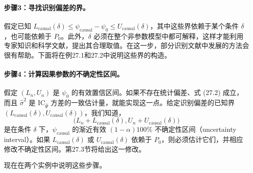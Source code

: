 \paragraph*{步骤3：寻找识别偏差的界。}
假定已知 $L_{\mathrm{causal}}(\delta)\leq\psi_{\mathrm{causal}}-\psi_0\leq U_{\mathrm{causal}}(\delta)$，其中这些界依赖于某个条件 $\delta$，也可能依赖于 $P_0$。此外，$\delta$ 必须在整个非参数模型中都可解释，这样才能利用专家知识和科学文献，提出其合理取值。在这一步，部分识别文献中发展的方法会很有帮助。下面将在例27.1和27.2中说明这些界的构造。

\paragraph*{步骤4：计算因果参数的不确定性区间。}
假定 $(L_n,U_n)$ 是 $\psi_0$ 的有效置信区间。如果不存在统计偏差、式 (27.2) 成立，而且 $\hat\sigma^2$ 是 $\mathrm{IC}_{\hat\Psi}$ 方差的一致估计量，就能实现这一点。给定识别偏差的已知界 $(L_{\mathrm{causal}}(\delta),U_{\mathrm{causal}}(\delta))$，我们知道，
\begin{equation}
 \bigl(L_n+L_{\mathrm{causal}}(\delta),U_n+U_{\mathrm{causal}}(\delta)\bigr)
 \tag{27.4}
\end{equation}
是在条件 $\delta$ 下，$\psi_{\mathrm{causal}}$ 的渐近有效 $(1-\alpha)100\%$ 不确定性区间（uncertainty interval）。如果 $L_{\mathrm{causal}}(\delta)$ 或 $U_{\mathrm{causal}}(\delta)$ 依赖于 $P_0$，则必须估计它们，并相应修改不确定性区间。第27.3节将给出这一修改。

现在在两个实例中说明这些步骤。

